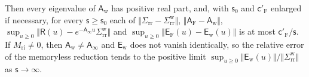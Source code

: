 \begin{proposition}
\begin{enumerate}
Then every eigenvalue of $\mathsf A_{\mathrm w}$ has positive real part, and, with $\mathsf s_0$ and $\mathsf c'_{\mathrm F}$ enlarged if necessary, for every $\mathsf s\ge\mathsf s_0$ each of $\Vert\Sigma_{\mathrm{rr}}-\Sigma^{\mathrm w}_{\mathrm{rr}}\Vert$, $\Vert\mathsf A_{\mathrm F}-\mathsf A_{\mathrm w}\Vert$, $\sup_{u\ge0}\Vert\mathsf R(u)-e^{-\mathsf A_\infty u}\Sigma^{\mathrm w}_{\mathrm{rr}}\Vert$ and $\sup_{u\ge0}\Vert\mathsf E_{\mathrm F}(u)-\mathsf E_{\mathrm w}(u)\Vert$ is at most $\mathsf c'_{\mathrm F}/\mathsf s$. If $M_{\mathrm{ri}}\ne0$, then $\mathsf A_{\mathrm w}\ne\mathsf A_\infty$ and $\mathsf E_{\mathrm w}$ does not vanish identically, so the relative error of the memoryless reduction tends to the positive limit $\sup_{u\ge0}\Vert\mathsf E_{\mathrm w}(u)\Vert/\Vert\Sigma^{\mathrm w}_{\mathrm{rr}}\Vert$ as $\mathsf s\to\infty$.
\end{enumerate}
\end{proposition}
